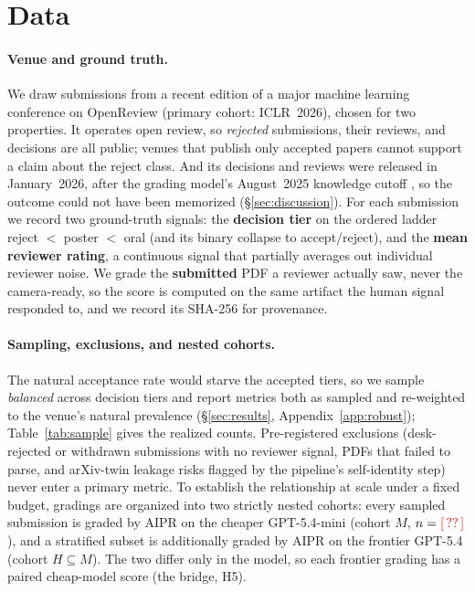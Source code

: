 \section{Data}
\label{sec:data}

\paragraph{Venue and ground truth.}
We draw submissions from a recent edition of a major machine learning conference on
OpenReview (primary cohort: ICLR~2026), chosen for two properties. It operates open
review, so \emph{rejected} submissions, their reviews, and decisions are all public;
venues that publish only accepted papers cannot support a claim about the reject class.
And its decisions and reviews were released in January~2026, after the grading model's
August~2025 knowledge cutoff \citep{openai2026gpt54}, so the outcome could not have been
memorized (\S\ref{sec:discussion}). For each submission we record two ground-truth signals: the
\textbf{decision tier} on the ordered ladder reject $<$ poster $<$ oral (and its binary
collapse to accept/reject), and the \textbf{mean reviewer rating}, a continuous signal
that partially averages out individual reviewer noise. We grade the \textbf{submitted}
PDF a reviewer actually saw, never the camera-ready, so the score is computed on the
same artifact the human signal responded to, and we record its SHA-256 for provenance.

\paragraph{Sampling, exclusions, and nested cohorts.}
The natural acceptance rate would starve the accepted tiers, so we sample
\emph{balanced} across decision tiers and report metrics both as sampled and re-weighted
to the venue's natural prevalence (\S\ref{sec:results}, Appendix~\ref{app:robust});
Table~\ref{tab:sample} gives the realized counts. Pre-registered exclusions
(desk-rejected or withdrawn submissions with no reviewer signal, PDFs that failed to
parse, and arXiv-twin leakage risks flagged by the pipeline's self-identity step) never
enter a primary metric. To establish the relationship at scale under a fixed budget,
gradings are organized into two strictly nested cohorts: every sampled submission is
graded by AIPR on the cheaper GPT-5.4-mini (cohort $M$, $n=\textcolor{red}{[\,??\,]}$), and a
stratified subset is additionally graded by AIPR on the frontier GPT-5.4 (cohort
$H \subseteq M$). The two differ only in the model, so each frontier grading has a
paired cheap-model score (the bridge, H5).

